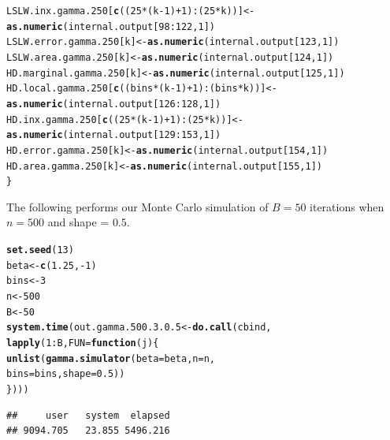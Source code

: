 \documentclass[11pt]{article}\usepackage[]{graphicx}\usepackage[]{color}
\makeatletter
\newcommand{\hlnum}[1]{\textcolor[rgb]{0.686,0.059,0.569}{#1}}%
\newcommand{\hlopt}[1]{\textcolor[rgb]{0,0,0}{#1}}%
\newcommand{\hlstd}[1]{\textcolor[rgb]{0.345,0.345,0.345}{#1}}%
\newcommand{\hlkwa}[1]{\textcolor[rgb]{0.161,0.373,0.58}{\textbf{#1}}}%
\newcommand{\hlkwb}[1]{\textcolor[rgb]{0.69,0.353,0.396}{#1}}%
\newcommand{\hlkwc}[1]{\textcolor[rgb]{0.333,0.667,0.333}{#1}}%
\newcommand{\hlkwd}[1]{\textcolor[rgb]{0.737,0.353,0.396}{\textbf{#1}}}%
\newenvironment{kframe}{%
 \def\at@end@of@kframe{}%
 \ifinner\ifhmode%
  \def\at@end@of@kframe{\end{minipage}}%
  \begin{minipage}{\columnwidth}%
 \fi\fi%
 \def\FrameCommand##1{\hskip\@totalleftmargin \hskip-\fboxsep
 \colorbox{shadecolor}{##1}\hskip-\fboxsep
     \hskip-\linewidth \hskip-\@totalleftmargin \hskip\columnwidth}%
 \MakeFramed {\advance\hsize-\width
   \@totalleftmargin\z@ \linewidth\hsize
   \@setminipage}}%
 {\par\unskip\endMakeFramed%
 \at@end@of@kframe}
\newenvironment{knitrout}{}{} %
\makeatother
\begin{document}
\begin{knitrout}
\begin{kframe}
\begin{alltt}
  \hlstd{LSLW.inx.gamma.250[}\hlkwd{c}\hlstd{((}\hlnum{25}\hlopt{*}\hlstd{(k}\hlopt{-}\hlnum{1}\hlstd{)}\hlopt{+}\hlnum{1}\hlstd{)}\hlopt{:}\hlstd{(}\hlnum{25}\hlopt{*}\hlstd{k))]} \hlkwb{<-}
    \hlkwd{as.numeric}\hlstd{(internal.output[}\hlnum{98}\hlopt{:}\hlnum{122}\hlstd{,} \hlnum{1}\hlstd{])}
  \hlstd{LSLW.error.gamma.250[k]} \hlkwb{<-} \hlkwd{as.numeric}\hlstd{(internal.output[}\hlnum{123}\hlstd{,} \hlnum{1}\hlstd{])}
  \hlstd{LSLW.area.gamma.250[k]} \hlkwb{<-} \hlkwd{as.numeric}\hlstd{(internal.output[}\hlnum{124}\hlstd{,} \hlnum{1}\hlstd{])}
  \hlstd{HD.marginal.gamma.250[k]} \hlkwb{<-} \hlkwd{as.numeric}\hlstd{(internal.output[}\hlnum{125}\hlstd{,} \hlnum{1}\hlstd{])}
  \hlstd{HD.local.gamma.250[}\hlkwd{c}\hlstd{((bins}\hlopt{*}\hlstd{(k}\hlopt{-}\hlnum{1}\hlstd{)}\hlopt{+}\hlnum{1}\hlstd{)}\hlopt{:}\hlstd{(bins}\hlopt{*}\hlstd{k))]} \hlkwb{<-}
    \hlkwd{as.numeric}\hlstd{(internal.output[}\hlnum{126}\hlopt{:}\hlnum{128}\hlstd{,} \hlnum{1}\hlstd{])}
  \hlstd{HD.inx.gamma.250[}\hlkwd{c}\hlstd{((}\hlnum{25}\hlopt{*}\hlstd{(k}\hlopt{-}\hlnum{1}\hlstd{)}\hlopt{+}\hlnum{1}\hlstd{)}\hlopt{:}\hlstd{(}\hlnum{25}\hlopt{*}\hlstd{k))]} \hlkwb{<-}
    \hlkwd{as.numeric}\hlstd{(internal.output[}\hlnum{129}\hlopt{:}\hlnum{153}\hlstd{,} \hlnum{1}\hlstd{])}
  \hlstd{HD.error.gamma.250[k]} \hlkwb{<-} \hlkwd{as.numeric}\hlstd{(internal.output[}\hlnum{154}\hlstd{,} \hlnum{1}\hlstd{])}
  \hlstd{HD.area.gamma.250[k]} \hlkwb{<-} \hlkwd{as.numeric}\hlstd{(internal.output[}\hlnum{155}\hlstd{,} \hlnum{1}\hlstd{])}
\hlstd{\}}
\end{alltt}
\end{kframe}
\end{knitrout}


The following performs our Monte Carlo simulation of $B = 50$ iterations 
when $n = 500$ and shape = $0.5$. 

\begin{knitrout}
\color{fgcolor}\begin{kframe}
\begin{alltt}
\hlkwd{set.seed}\hlstd{(}\hlnum{13}\hlstd{)}
\hlstd{beta} \hlkwb{<-} \hlkwd{c}\hlstd{(}\hlnum{1.25}\hlstd{,} \hlopt{-}\hlnum{1}\hlstd{)}
\hlstd{bins} \hlkwb{<-} \hlnum{3}
\hlstd{n} \hlkwb{<-} \hlnum{500}
\hlstd{B} \hlkwb{<-} \hlnum{50}
\hlkwd{system.time}\hlstd{(out.gamma.500.3.0.5} \hlkwb{<-} \hlkwd{do.call}\hlstd{(cbind,}
  \hlkwd{lapply}\hlstd{(}\hlnum{1}\hlopt{:}\hlstd{B,} \hlkwc{FUN} \hlstd{=} \hlkwa{function}\hlstd{(}\hlkwc{j}\hlstd{)\{}
    \hlkwd{unlist}\hlstd{(}\hlkwd{gamma.simulator}\hlstd{(}\hlkwc{beta} \hlstd{= beta,} \hlkwc{n} \hlstd{= n,}
      \hlkwc{bins} \hlstd{= bins,} \hlkwc{shape} \hlstd{=} \hlnum{0.5}\hlstd{))}
\hlstd{\})))}
\end{alltt}
\begin{verbatim}
##     user   system  elapsed 
## 9094.705   23.855 5496.216
\end{verbatim}
\end{kframe}
\end{knitrout}
\end{document}
